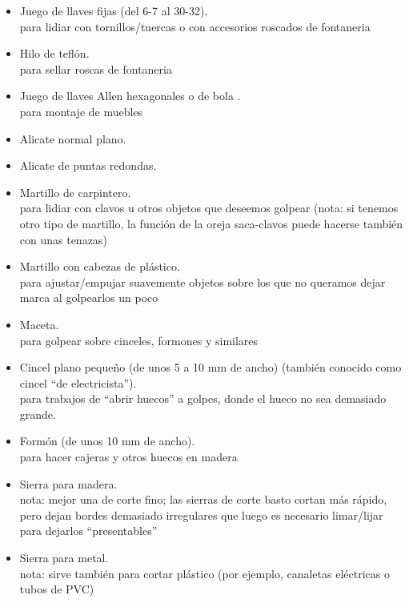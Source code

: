 \documentclass[spanish,10pt,a4paper,final,oneside]{article}
\begin{document}
\begin{itemize}
\item Juego de llaves fijas (del 6-7 al 30-32).
\\para lidiar con tornillos/tuercas o con accesorios roscados de fontaneria

\item Hilo de teflón.
\\para sellar roscas de fontaneria

\item Juego de llaves Allen hexagonales o de bola .
\\para montaje de muebles

\item Alicate normal plano.

\item Alicate de puntas redondas.

\item Martillo de carpintero.
\\para lidiar con clavos u otros objetos que deseemos golpear (nota: si tenemos otro tipo de martillo, la función de la oreja saca-clavos puede hacerse también con unas tenazas)

\item Martillo con cabezas de plástico.
\\para ajustar/empujar suavemente objetos sobre los que no queramos dejar marca al golpearlos un poco

\item Maceta.
\\para golpear sobre cinceles, formones y similares

\item Cincel plano pequeño (de unos 5 a 10 mm de ancho) (también conocido como cincel ``de electricista'').
\\para trabajos de ``abrir huecos'' a golpes, donde el hueco no sea demasiado grande.

\item Formón (de unos 10 mm de ancho).
\\para hacer cajeras y otros huecos en madera

\item Sierra para madera.
\\nota: mejor una de corte fino; las sierras de corte basto cortan más rápido, pero dejan bordes demasiado irregulares que luego es necesario limar/lijar para dejarlos ``presentables''

\item Sierra para metal.
\\nota: sirve también para cortar plástico (por ejemplo, canaletas eléctricas o tubos de PVC) 


\end{itemize}
\end{document}
